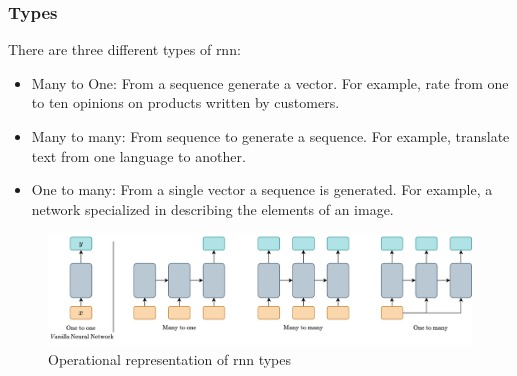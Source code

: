 \subsubsection{Types}
There are three different types of \acrshort{rnn}:
\begin{itemize}
    \item Many to One: From a sequence generate a vector. For example, rate from one to ten opinions on products written by customers.
    \item Many to many: From sequence to generate a sequence. For example, translate text from one language to another.
    \item One to many: From a single vector a sequence is generated. For example, a network specialized in describing the elements of an image.
\end{itemize}

\begin{figure}[H]
    \centering
    \includegraphics[width=14cm]{images/state-of-art/rnn/rnn-types.png}
    \caption{Operational representation of \acrshort{rnn} types}
    \label{fig:rnn_types}
\end{figure}
